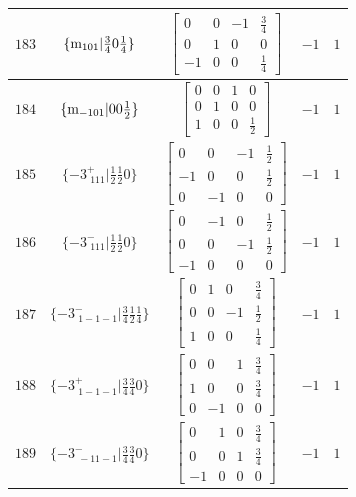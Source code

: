 \documentclass[fleqn,8pt]{jsarticle}
\begin{document}
\begin{longtable}{ccccc}
$ 183 $ & $ \{{\rm m}_{101}|\frac{3}{4} 0 \frac{1}{4}\} $ & $ \begin{bmatrix} 0 & 0 & -1 & \frac{3}{4} \\ 0 & 1 & 0 & 0 \\ -1 & 0 & 0 & \frac{1}{4} \end{bmatrix} $ & $ -1 $ & $ 1 $ \\ \hline
$ 184 $ & $ \{{\rm m}_{-101}|0 0 \frac{1}{2}\} $ & $ \begin{bmatrix} 0 & 0 & 1 & 0 \\ 0 & 1 & 0 & 0 \\ 1 & 0 & 0 & \frac{1}{2} \end{bmatrix} $ & $ -1 $ & $ 1 $ \\ \hline
$ 185 $ & $ \{-3^{+}_{\,\,111}|\frac{1}{2} \frac{1}{2} 0\} $ & $ \begin{bmatrix} 0 & 0 & -1 & \frac{1}{2} \\ -1 & 0 & 0 & \frac{1}{2} \\ 0 & -1 & 0 & 0 \end{bmatrix} $ & $ -1 $ & $ 1 $ \\ \hline
$ 186 $ & $ \{-3^{-}_{\,\,111}|\frac{1}{2} \frac{1}{2} 0\} $ & $ \begin{bmatrix} 0 & -1 & 0 & \frac{1}{2} \\ 0 & 0 & -1 & \frac{1}{2} \\ -1 & 0 & 0 & 0 \end{bmatrix} $ & $ -1 $ & $ 1 $ \\ \hline
$ 187 $ & $ \{-3^{-}_{\,\,1-1-1}|\frac{3}{4} \frac{1}{2} \frac{1}{4}\} $ & $ \begin{bmatrix} 0 & 1 & 0 & \frac{3}{4} \\ 0 & 0 & -1 & \frac{1}{2} \\ 1 & 0 & 0 & \frac{1}{4} \end{bmatrix} $ & $ -1 $ & $ 1 $ \\ \hline
$ 188 $ & $ \{-3^{+}_{\,\,1-1-1}|\frac{3}{4} \frac{3}{4} 0\} $ & $ \begin{bmatrix} 0 & 0 & 1 & \frac{3}{4} \\ 1 & 0 & 0 & \frac{3}{4} \\ 0 & -1 & 0 & 0 \end{bmatrix} $ & $ -1 $ & $ 1 $ \\ \hline
$ 189 $ & $ \{-3^{-}_{\,\,-11-1}|\frac{3}{4} \frac{3}{4} 0\} $ & $ \begin{bmatrix} 0 & 1 & 0 & \frac{3}{4} \\ 0 & 0 & 1 & \frac{3}{4} \\ -1 & 0 & 0 & 0 \end{bmatrix} $ & $ -1 $ & $ 1 $ \\ \hline

\end{longtable}
\end{document}
